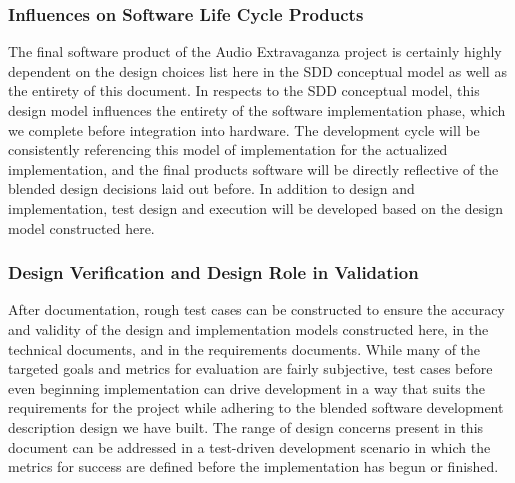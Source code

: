 \subsubsection{Influences on Software Life Cycle Products}
The final software product of the Audio Extravaganza project is certainly highly dependent on the design choices list here in the SDD conceptual model as well as the entirety of this document. In respects to the SDD conceptual model, this design model influences the entirety of the software implementation phase, which we complete before integration into hardware. The development cycle will be consistently referencing this model of implementation for the actualized implementation, and the final product\textsc{}s software will be directly reflective of the blended design decisions laid out before. In addition to design and implementation, test design and execution will be developed based on the design model constructed here. 

\subsubsection{Design Verification and Design Role in Validation}
After documentation, rough test cases can be constructed to ensure the accuracy and validity of the design and implementation models constructed here, in the technical documents, and in the requirements documents. While many of the targeted goals and metrics for evaluation are fairly subjective, test cases before even beginning implementation can drive development in a way that suits the requirements for the project while adhering to the blended software development description design we have built. The range of design concerns present in this document can be addressed in a test-driven development scenario in which the metrics for success are defined before the implementation has begun or finished. 
